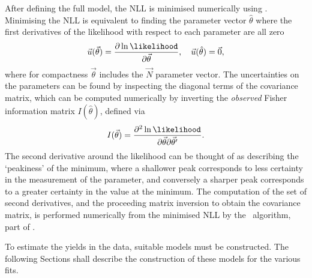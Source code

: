 After defining the full model, the \acl{NLL} is minimised numerically using 
\minuit.
Minimising the \ac{NLL} is equivalent to finding the parameter vector 
$\hat{\theta}$ where the first derivatives of the likelihood with respect to 
each parameter are all zero
\begin{equation}
  \vec{u}(\vec{\theta}) = \frac{%
    \partial\ln{\likelihood}
  }{%
    \partial\vec{\theta}
  },\quad
  \vec{u}(\hat{\theta}) = \vec{0},
\end{equation}
where for compactness $\vec{\theta}$ includes the $\vec{N}$ parameter vector.
The uncertainties on the parameters can be found by inspecting the diagonal 
terms of the covariance matrix, which can be computed numerically by inverting 
the \emph{observed} Fisher information matrix $I(\hat{\theta})$, defined via
\begin{equation}
  I(\vec{\theta}) = \frac{%
    \partial^{2}\ln{\likelihood}
  }{%
    \partial\vec{\theta}\partial\vec{\theta}'
  }.
\end{equation}
The second derivative around the likelihood can be thought of as describing the 
`peakiness' of the minimum, where a shallower peak corresponds to less 
certainty in the measurement of the parameter, and conversely a sharper peak 
corresponds to a greater certainty in the value at the minimum.
The computation of the set of second derivatives, and the proceeding matrix 
inversion to obtain the covariance matrix, is performed numerically from the 
minimised \ac{NLL} by the \hesse\ algorithm, part of \minuit.

To estimate the yields in the data, suitable models must be constructed.
The following Sections shall describe the construction of these models for the 
various fits.
